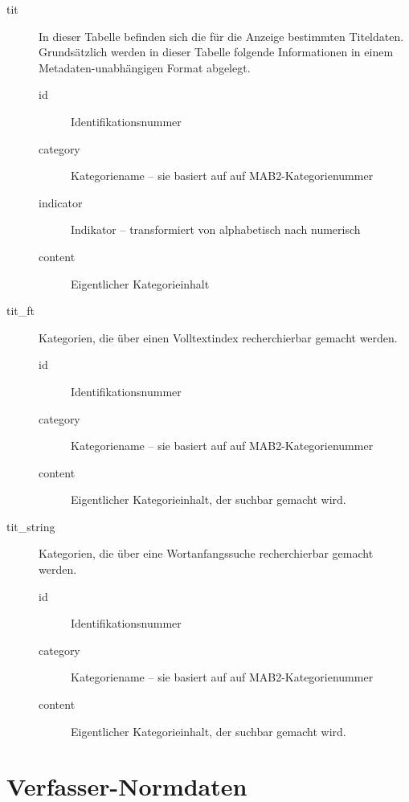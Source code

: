 \documentclass[11pt, twoside, a4paper, BCOR8mm, DIV12, bibtotoc,idxtotoc]{scrbook}
\begin{document}
\begin{description}
\item[tit] In dieser Tabelle befinden sich die für die Anzeige
  bestimmten Titeldaten. Grundsätzlich werden in dieser Tabelle
  folgende Informationen in einem Metadaten-unabhängigen Format
  abgelegt.
  \begin{description}
  \item[id] Identifikationsnummer
  \item[category] Kategoriename -- sie basiert auf auf MAB2-Kategorienummer
  \item[indicator] Indikator -- transformiert von alphabetisch nach numerisch
  \item[content] Eigentlicher Kategorieinhalt
  \end{description}
\item[tit\_ft] Kategorien, die über einen Volltextindex recherchierbar
  gemacht werden.
  \begin{description}
  \item[id] Identifikationsnummer
  \item[category] Kategoriename -- sie basiert auf auf MAB2-Kategorienummer
  \item[content] Eigentlicher Kategorieinhalt, der suchbar gemacht wird.
  \end{description}
\item[tit\_string] Kategorien, die über eine Wortanfangssuche
  recherchierbar gemacht werden.
  \begin{description}
  \item[id] Identifikationsnummer
  \item[category] Kategoriename -- sie basiert auf auf MAB2-Kategorienummer
  \item[content] Eigentlicher Kategorieinhalt, der suchbar gemacht wird.
  \end{description}
\end{description}

\section{Verfasser-Normdaten}
\end{document}
